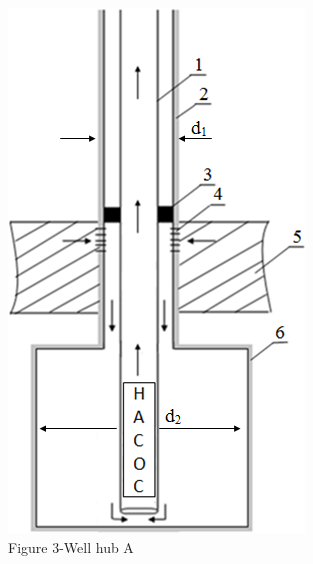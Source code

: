 \begin{figure}[H]
\begin{subfigure}[b]{0.25\textwidth}
      \includegraphics[width=\linewidth]{assets/1341}
      \caption*{Figure 3-Well hub A}
    \end{subfigure}
  \caption*{}
\end{figure}

